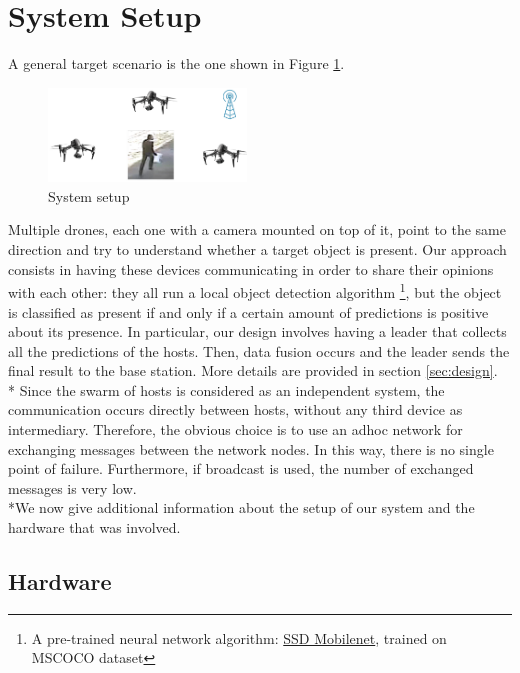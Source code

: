 \documentclass[10pt,conference,compsocconf]{IEEEtran}
\begin{document}
\section{System Setup}
A general target scenario is the one shown in Figure \ref{fig:setup}.
\begin{figure}[h!]
	\centering
	\includegraphics[width=0.47\textwidth]{img/setup.png}
	\caption{System setup}
	\label{fig:setup}
\end{figure}
Multiple drones, each one with a camera mounted on top of it, point to the same direction and try to understand whether a target object is present. Our approach consists in having these devices communicating in order to share their opinions with each other: they all run a local object detection algorithm \footnote{A pre-trained neural network algorithm: \href{https://github.com/tensorflow/models/blob/master/research/object\_detection/g3doc/detection_model_zoo.md}{SSD Mobilenet}, trained on MSCOCO dataset}, but the object is classified as present if and only if a certain amount of predictions is positive about its presence. In particular, our design involves having a leader that collects all the predictions of the hosts. Then, data fusion occurs and the leader sends the final result to the base station. More details are provided in section \ref{sec:design}.\\*
Since the swarm of hosts is considered as an independent system, the communication occurs directly between hosts, without any third device as intermediary. Therefore, the obvious choice is to use an adhoc network for exchanging messages between the network nodes. In this way, there is no single point of failure. Furthermore, if broadcast is used, the number of exchanged messages is very low. %
\\*We now give additional information about the setup of our system and the hardware that was involved.
\subsection{Hardware}
\end{document}
